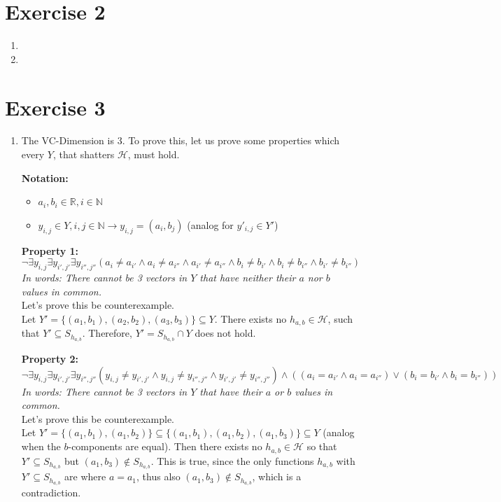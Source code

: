 \documentclass[12pt]{article}
\begin{document}
\section*{Exercise 2}
\begin{enumerate}[label=(\alph*)]
	\item
	\item
\end{enumerate}

\section*{Exercise 3}
\begin{enumerate}[label=(\alph*)]
	\item	The VC-Dimension is $3$. To prove this, let us prove some properties which every $Y$, that shatters $\mathcal{H}$, must hold.

			\textbf{Notation:}
			\begin{itemize}
				\item	$a_i, b_i \in \mathbb{R}, i \in \mathbb{N}$
				\item	$y_{i,j} \in Y , i,j \in \mathbb{N} \rightarrow y_{i,j} = (a_i, b_j)$ (analog for $y'_{i,j} \in Y'$)
			\end{itemize}

			\textbf{Property 1:}
			$$\neg \exists y_{i, j} \exists y_{i', j'} \exists y_{i'', j''} (a_i \neq a_{i'} \land a_i \neq a_{i''} \land a_{i'} \neq a_{i''} \land b_i \neq b_{i'} \land b_i \neq b_{i''} \land b_{i'} \neq b_{i''})$$
			\textit{In words: There cannot be 3 vectors in $Y$ that have neither their $a$ nor $b$ values in common.} \\
			Let's prove this be counterexample. \\
			Let $Y' = \{(a_1, b_1), (a_2, b_2), (a_3, b_3)\} \subseteq Y$. There exists no $h_{a,b} \in \mathcal{H}$, such that $Y' \subseteq S_{h_{a,b}}$. Therefore, $Y' = S_{h_{a,b}} \cap Y$ does not hold.

			\textbf{Property 2:}
			$$\neg \exists y_{i, j} \exists y_{i', j'} \exists y_{i'', j''} (y_{i,j} \neq y_{i',j'} \land y_{i,j} \neq y_{i'',j''} \land y_{i',j'} \neq y_{i'',j''}) \land ((a_i = a_{i'} \land a_i = a_{i''}) \lor (b_i = b_{i'} \land b_i = b_{i''}))$$
			\textit{In words: There cannot be 3 vectors in $Y$ that have their $a$ or $b$ values in common.} \\
			Let's prove this be counterexample. \\
			Let $Y' = \{(a_1, b_1), (a_1, b_2)\} \subseteq \{(a_1, b_1), (a_1, b_2), (a_1, b_3)\} \subseteq Y$ (analog when the $b$-components are equal). Then there exists no $h_{a,b} \in \mathcal{H}$ so that $Y' \subseteq S_{h_{a,b}}$ but $(a_1, b_3) \not\in S_{h_{a,b}}$. This is true, since the only functions $h_{a,b}$ with $Y' \subseteq S_{h_{a,b}}$ are where $a = a_1$, thus also $(a_1, b_3) \not\in S_{h_{a,b}}$, which is a contradiction.


\end{enumerate}
\end{document}
